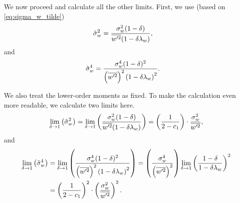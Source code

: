 We now proceed and calculate all the other limits.
First, we use (based on \cref{eq:sigma_w_tilde})
\begin{align}
    \label{eq:sigma_w_tilde_2}
    \tilde{\sigma}_w^2
    &= \frac{\sigma_w^2 (1-\delta)}{\overline{w'^2} (1-\delta\lambda_w)},
\end{align}
and
\begin{align}
    \label{eq:sigma_w_tilde_4}
    \tilde{\sigma}_w^4
    &= \frac{\sigma_w^4 (1-\delta)^2}{\left(\overline{w'^2}\right)^2 \left(1-\delta\lambda_w\right)^2}.
\end{align}

We also treat the lower-order moments as fixed.
To make the calculation even more readable,
we calculate two limits here.
\begin{align}
    \label{eq:sigma_w_tilde_2_limit_delta_to_1}
    \lim_{\delta \to 1}\left(\tilde{\sigma}_w^2\right)
    = \lim_{\delta \to 1}\left(\frac{\sigma_w^2 (1-\delta)}{\overline{w'^2} (1-\delta\lambda_w)}\right)
    = \left(\frac{1}{2 - c_1}\right) \cdot \frac{\sigma_w^2}{\overline{w'^2}},
\end{align}
and
\begin{align}
    \label{eq:sigma_w_tilde_4_limit_delta_to_1}
    \lim_{\delta \to 1}\left(\tilde{\sigma}_w^4\right)
    &= \lim_{\delta \to 1}\left(\frac{\sigma_w^4 (1-\delta)^2}{\left(\overline{w'^2}\right)^2 \left(1-\delta\lambda_w\right)^2}\right)
    = \left(\frac{\sigma_w^4}{\left(\overline{w'^2}\right)^2}\right) \lim_{\delta \to 1} \left(\frac{1-\delta}{1-\delta\lambda_w}\right)^2 \\
    &= \left(\frac{1}{2 - c_1}\right)^2 \cdot \left(\frac{\sigma_w^2}{\overline{w'^2}}\right)^2.
\end{align}

